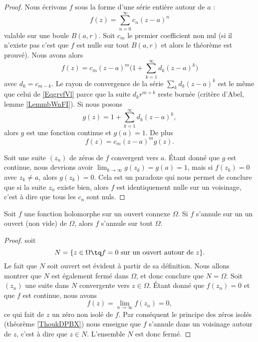 \begin{proof}
    Nous écrivons \( f\) sous la forme d'une série entière autour de \( a\) :
    \begin{equation}        \label{EqgrvfVl}
        f(z)=\sum_{n=0}^{\infty}c_n(z-a)^n
    \end{equation}
    valable sur une boule \( B(a,r)\). Soit \( c_m\) le premier coefficient non nul (si il n'existe pas c'est que \( f\) est nulle sur tout \( B(a,r) \) et alors le théorème est prouvé). Nous avons alors
    \begin{equation}
        f(z)=c_m(z-a)^m\big( 1+\sum_{k=1}^{\infty}d_k(z-a)^k \big)
    \end{equation}
    avec \( d_k=c_{m-k}\). Le rayon de convergence de la série \( \sum_k d_k(z-a)^k\) est le même que celui de \eqref{EqgrvfVl} parce que la suite \( d_kr^{m+k}\) reste bornée (critère d'Abel, lemme \ref{LemmbWnFI}). Si nous posons
    \begin{equation}
        g(z)=1+\sum_{k=1}^{\infty}d_k(z-a)^k,
    \end{equation}
    alors \( g\) est une fonction continue et \( g(a)=1\). De plus 
    \begin{equation}
        f(z)=c_m(z-a)^mg(z).
    \end{equation}

    Soit une suite \( (z_n)\) de zéros de \( f\) convergent vers \( a\). Étant donné que \( g\) est continue, nous devrions avoir \( \lim_{k\to\infty}g(z_k)=g(a)=1\), mais si \( f(z_k)=0\) avec \( z_k\neq a\), alors \( g(z_k)=0\). Cela est un paradoxe qui nous permet de conclure que si la suite \( z_n\) existe bien, alors \( f\) est identiquement nulle sur un voisinage, c'est à dire que tous les \( c_n\) sont nuls.
\end{proof}

\begin{corollary}       \label{CORooFBXXooZyfUQi}
    Soit \( f\) une fonction holomorphe sur un ouvert connexe \( \Omega\). Si \( f\) s'annule sur un un ouvert (non vide) de \( \Omega\), alors \( f\) s'annule sur tout \( \Omega\).
\end{corollary}

\begin{proof}
    soit 
    \begin{equation}
        N=\{ z\in \Omega\tq f=0\text{ sur un ouvert autour de }z \}.
    \end{equation}
    Le fait que \( N\) soit ouvert est évident à partir de sa définition. Nous allons montrer que \( N\) est également fermé dans \( \Omega\), et donc conclure que \( N=\Omega\). Soit \( (z_n)\) une suite dans \( N\) convergente vers \( z\in \Omega\). Étant donné que \( f(z_n)=0\) et que \( f\) est continue, nous avons
    \begin{equation}
        f(z)=\lim_{n\to \infty} f(z_n)=0,
    \end{equation}
    ce qui fait de \( z\) un zéro non isolé de \( f\). Par conséquent le principe des zéros isolés (théorème \ref{ThoukDPBX}) nous enseigne que \( f\) s'annule dans un voisinage autour de \( z\), c'est à dire que \( z\in N\). L'ensemble \( N\) est donc fermé.
\end{proof}

